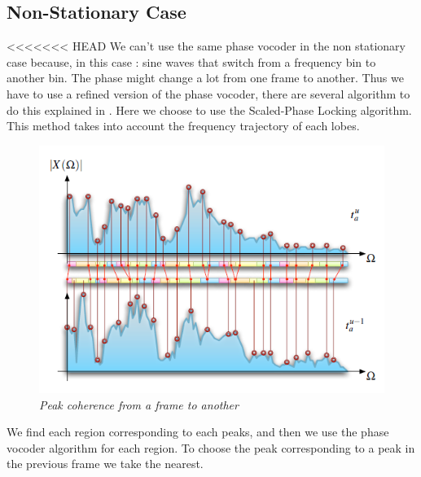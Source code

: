 \documentclass[]{article}
\begin{document}
\subsection{Non-Stationary Case}\label{non-stationary-case}
<<<<<<< HEAD
We can't use the same phase vocoder in the non stationary case because, in this case : sine
waves that switch from a frequency bin to another bin. The phase might change a
lot from one frame to another.
Thus we have to use a refined version of the phase vocoder, there are several algorithm to do this explained in \cite{karrer2006phavorit}. Here we choose to use the Scaled-Phase Locking algorithm. 
This method takes into account the frequency trajectory of each lobes.
\begin{figure}
	\centering
	\includegraphics[scale=0.4]{peaktrajectory.png}
	\caption{\it Peak coherence from a frame to another}
\end{figure}
We find each region corresponding to each peaks, and then we use the phase vocoder algorithm for each region. To choose the peak corresponding to a peak in the previous frame we take the nearest.
\end{document}
